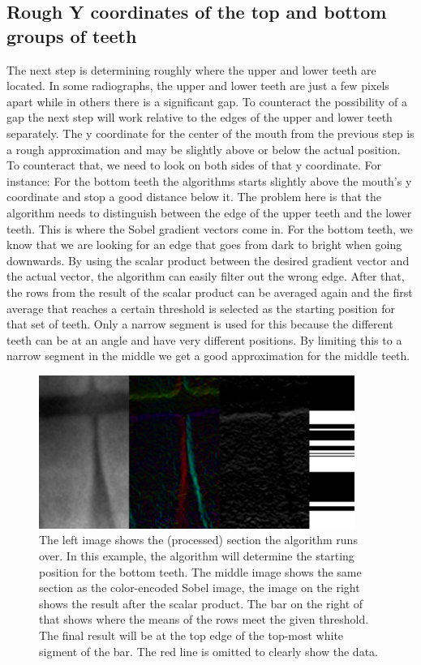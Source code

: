 \documentclass[a4paper,10pt]{article}
\begin{document}
\subsection{Rough Y coordinates of the top and bottom groups of teeth} 
The next step is determining roughly where the upper and lower teeth are located. In some radiographs, the upper and lower teeth are just a few pixels apart while in others there is a significant gap. To counteract the possibility of a gap the next step will work relative to the edges of the upper and lower teeth separately. The y coordinate for the center of the mouth from the previous step is a rough approximation and may be slightly above or below the actual position. To counteract that, we need to look on both sides of that y coordinate. For instance: For the bottom teeth the algorithms starts slightly above the mouth's y coordinate and stop a good distance below it. The problem here is that the algorithm needs to distinguish between the edge of the upper teeth and the lower teeth. This is where the Sobel gradient vectors come in. For the bottom teeth, we know that we are looking for an edge that goes from dark to bright when going downwards. By using the scalar product between the desired gradient vector and the actual vector, the algorithm can easily filter out the wrong edge. After that, the rows from the result of the scalar product can be averaged again and the first average that reaches a certain threshold is selected as the starting position for that set of teeth. Only a narrow segment is used for this because the different teeth can be at an angle and have very different positions. By limiting this to a narrow segment in the middle we get a good approximation for the middle teeth.
\begin{figure}[h]
\centering
\includegraphics[height=50mm]{teeth_vertical.png}
 \caption{The left image shows the (processed) section the algorithm runs over. In this example, the algorithm will determine the starting position for the bottom teeth. The middle image shows the same section as the color-encoded Sobel image, the image on the right shows the result after the scalar product. The bar on the right of that shows where the means of the rows meet the given threshold. The final result will be at the top edge of the top-most white sigment of the bar. The red line is omitted to clearly show the data.}
\end{figure}
\end{document}
